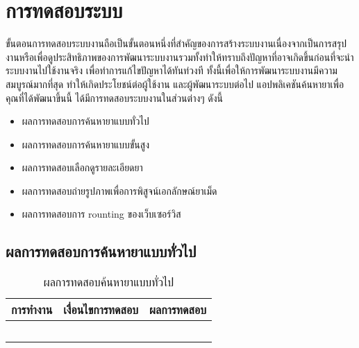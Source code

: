 \chapter{การทดสอบระบบ}
ขั้นตอนการทดสอบระบบงานถือเป็นขั้นตอนหนึ่งที่สำคัญของการสร้างระบบงานเนื่องจากเป็นการสรุปงานหรือเพื่อดูประสิทธิภาพของการพัฒนาระบบงานรวมทั้งทำให้ทราบถึงปัญหาที่อาจเกิดขึ้นก่อนที่จะนำระบบงานไปใช้งานจริง เพื่อทำการแก้ไขปัญหาได้ทันท่วงที ทั้งนี้เพื่อให้การพัฒนาระบบงานมีความสมบูรณ์มากที่สุด ทำให้เกิดประโยชน์ต่อผู้ใช้งาน และผู้พัฒนาระบบต่อไป แอปพลิเคชันค้นหายาเพื่อคุณที่ได้พัฒนาขึ้นนี้ 
ได้มีการทดสอบระบบงานในส่วนต่างๆ ดังนี้
\begin{itemize}[label={--}]
	\item ผลการทดสอบการค้นหายาแบบทั่วไป
	\item ผลการทดสอบการค้นหายาแบบขั้นสูง
	\item ผลการทดสอบเลือกดูรายละเอียดยา
	\item ผลการทดสอบถ่ายรูปภาพเพื่อการพิสูจน์เอกลักษณ์ยาเม็ด
	\item ผลการทดสอบการ rounting ของเว็บเซอร์วิส
\end{itemize}

\section{ผลการทดสอบการค้นหายาแบบทั่วไป}
\begin{table}[H]
	\caption{ผลการทดสอบค้นหายาแบบทั่วไป}
    \centering	
	\label{tab:test1}
    \begin{tabular}{ | p{4.5cm} | p{4.5cm} | p{4.5cm} | }
    \hline
	การทำงาน & เงื่อนไขการทดสอบ & ผลการทดสอบ \\ \hline
	\setstretch{1.0}{ทดสอบการค้นหาแบบทั่วไป 
	& \setstretch{1.0}{ไม่กรอกข้อมูล และกดค้นหา }
	& \setstretch{1.0}{แอปพลิเคชันแสดงข้อความ “ไม่พบคำร้องขอ”} \\ \cline{2-3} 
	& \setstretch{1.0}{กรอกข้อมูลครบ และกดค้นหา} 
	& \setstretch{1.0}{แอปพลิเคชันแสดงรายการค้นหาให้กับผู้ใช้งาน} \\ \cline{2-3} 
	& \setstretch{1.0}{กรอกข้อมูลด้วยภาษาไทย}  
	& \setstretch{1.0}{แอปพลิเคชันแสดงรายการค้นหา และแสดงรายการ} \\ \cline{2-3} 
	& \setstretch{1.0}{กรอกข้อมูลด้วยภาษาอังกฤษ} 
	& \setstretch{1.0}{แอปพลิเคชันแสดงรายการค้นหา และแสดงรายการ} \\ \cline{2-3} 
	& \setstretch{1.0}{กดปุ่ม Cancel} 
	& \setstretch{1.0}{แอปพลิเคชันจะกลับมาแสดงหน้าค้นหายา} \\ \hline
    \end{tabular}
\end{table}


